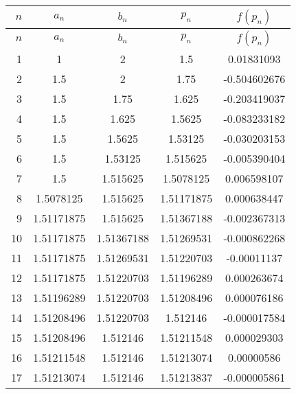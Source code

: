 \documentclass[../../../../Assignments.tex]{subfiles}
\begin{document}
\begin{solution}
\begin{enumerate}[label = (\alph*)]
            \begin{longtable}{r S[table-format=1.8] S[table-format=1.8] S[table-format=1.8] S[table-format=-1.9]}
                \toprule
                \(n\)  &   {\(a_n\)}   &   {\(b_n\)}   &   {\(p_n\)}   &  {\(f(p_n)\)}  \\
                \midrule
                \endfirsthead
                \(n\)  &   {\(a_n\)}   &   {\(b_n\)}   &   {\(p_n\)}   &  {\(f(p_n)\)}  \\
                \midrule
                  &  1            &  2            &  1.5          &   0.01831093   \\
                    2  &  1.5          &  2            &  1.75         &  -0.504602676  \\
                    3  &  1.5          &  1.75         &  1.625        &  -0.203419037  \\
                    4  &  1.5          &  1.625        &  1.5625       &  -0.083233182  \\
                    5  &  1.5          &  1.5625       &  1.53125      &  -0.030203153  \\
                    6  &  1.5          &  1.53125      &  1.515625     &  -0.005390404  \\
                    7  &  1.5          &  1.515625     &  1.5078125    &   0.006598107  \\
                    8  &  1.5078125    &  1.515625     &  1.51171875   &   0.000638447  \\
                    9  &  1.51171875   &  1.515625     &  1.51367188   &  -0.002367313  \\
                   10  &  1.51171875   &  1.51367188   &  1.51269531   &  -0.000862268  \\
                   11  &  1.51171875   &  1.51269531   &  1.51220703   &  -0.00011137   \\
                   12  &  1.51171875   &  1.51220703   &  1.51196289   &   0.000263674  \\
                   13  &  1.51196289   &  1.51220703   &  1.51208496   &   0.000076186  \\
                   14  &  1.51208496   &  1.51220703   &  1.512146     &  -0.000017584  \\
                   15  &  1.51208496   &  1.512146     &  1.51211548   &   0.000029303  \\
                   16  &  1.51211548   &  1.512146     &  1.51213074   &   0.00000586   \\
                   17  &  1.51213074   &  1.512146     &  1.51213837   &  -0.000005861  \\
                \bottomrule
            \end{longtable}


\end{enumerate}
\end{solution}
\end{document}
